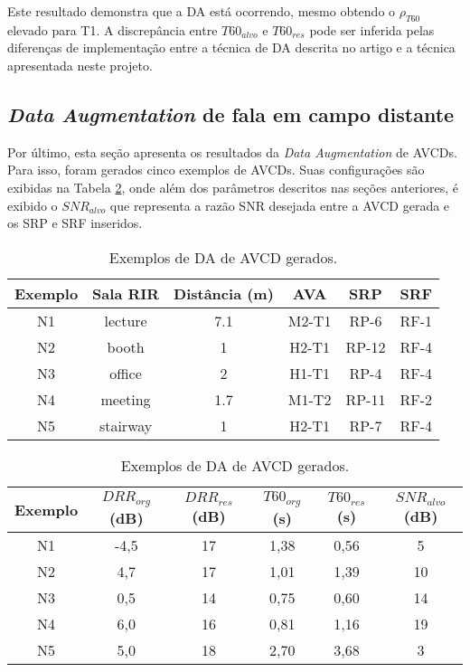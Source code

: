 Este resultado demonstra que a DA está ocorrendo, mesmo obtendo o $\rho_{T60}$ elevado para T1.
A discrepância entre $T60_{alvo}$ e $T60_{res}$ pode ser inferida pelas diferenças de implementação entre a técnica de DA descrita no artigo 
\cite{RIR_Data_Aug} e a técnica apresentada neste projeto. 


\subsection{\textit{Data Augmentation} de fala em campo distante}

Por último, esta seção apresenta os resultados da \textit{Data Augmentation} de AVCDs. Para isso, 
foram gerados cinco exemplos de AVCDs. Suas configurações são exibidas na Tabela \ref{tbl:da-noise}, onde além dos parâmetros descritos nas
seções anteriores, é exibido o $SNR_{alvo}$ que representa a razão SNR desejada entre a AVCD gerada e os SRP e SRF inseridos.

\begin{table} [H]
    \centering
    \caption{Exemplos de DA de AVCD gerados.}
    \label{tbl:da-noise}
    \begin{tabular}{c|c|c|c|c|c}

        \textbf{Exemplo} & 
        \textbf{Sala RIR} & 
        \textbf{Distância (m)} &
        \textbf{AVA} &
        \textbf{SRP} &
        \textbf{SRF} \\
        \hline 

        N1 & lecture & 7.1 & M2-T1 & RP-6 & RF-1 \\
        N2 & booth & 1 & H2-T1 & RP-12 & RF-4 \\
        N3 & office & 2 & H1-T1 & RP-4 & RF-4 \\
        N4 & meeting & 1.7 & M1-T2 & RP-11 & RF-2 \\
        N5 & stairway & 1 & H2-T1 & RP-7 & RF-4 \\

    \end{tabular}
    \bigbreak
    \bigbreak
    \begin{tabular}{c|c|c|c|c|c}

        \textbf{Exemplo} & 
        \textbf{$DRR_{org}$ (dB)} & 
        \textbf{$DRR_{res}$ (dB)} & 
        \textbf{$T60_{org}$ (s)} & 
        \textbf{$T60_{res}$ (s)} &
        \textbf{$SNR_{alvo}$ (dB)} \\
        \hline 

        N1 & -4,5 & 17 & 1,38 & 0,56 & 5 \\
        N2 & 4,7 & 17 & 1,01 & 1,39 & 10 \\
        N3 & 0,5 & 14 & 0,75 & 0,60 & 14 \\
        N4 & 6,0 & 16 & 0,81 & 1,16 & 19 \\
        N5 & 5,0 & 18 & 2,70 & 3,68 & 3 \\

    \end{tabular}
\end{table}

